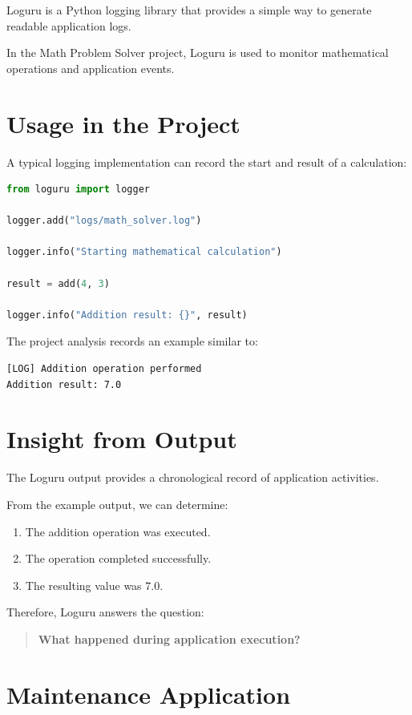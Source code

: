 \documentclass[12pt,a4paper]{report}
\begin{document}
Loguru is a Python logging library that provides a simple way to
generate readable application logs.

In the Math Problem Solver project, Loguru is used to monitor
mathematical operations and application events.

\section{Usage in the Project}

A typical logging implementation can record the start and result of a
calculation:

\begin{lstlisting}[language=Python]
from loguru import logger

logger.add("logs/math_solver.log")

logger.info("Starting mathematical calculation")

result = add(4, 3)

logger.info("Addition result: {}", result)
\end{lstlisting}

The project analysis records an example similar to:

\begin{lstlisting}
[LOG] Addition operation performed
Addition result: 7.0
\end{lstlisting}

\section{Insight from Output}

The Loguru output provides a chronological record of application
activities.

From the example output, we can determine:

\begin{enumerate}
    \item The addition operation was executed.
    \item The operation completed successfully.
    \item The resulting value was 7.0.
\end{enumerate}

Therefore, Loguru answers the question:

\begin{quote}
\textbf{What happened during application execution?}
\end{quote}

\section{Maintenance Application}
\end{document}
